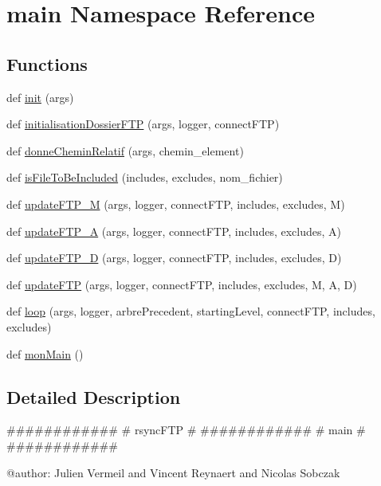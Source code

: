 \hypertarget{namespacemain}{}\section{main Namespace Reference}
\label{namespacemain}
\subsection*{Functions}
\begin{DoxyCompactItemize}
\item 
def \hyperlink{namespacemain_a0e290154722b65ed489c05ccb63123a4}{init} (args)
\item 
def \hyperlink{namespacemain_af2b805eecb08e493981427109e24bfb4}{initialisation\+Dossier\+F\+TP} (args, logger, connect\+F\+TP)
\item 
def \hyperlink{namespacemain_a00446ed819ceb3ba2a2efc386436b91c}{donne\+Chemin\+Relatif} (args, chemin\+\_\+element)
\item 
def \hyperlink{namespacemain_a7521c189c12c457f31fb27b6f1b8054c}{is\+File\+To\+Be\+Included} (includes, excludes, nom\+\_\+fichier)
\item 
def \hyperlink{namespacemain_a97bbb0b263cc3d0576c9d51867c02af6}{update\+F\+T\+P\+\_\+M} (args, logger, connect\+F\+TP, includes, excludes, M)
\item 
def \hyperlink{namespacemain_adc47cfe67a92cb5fbd422ddb0a0c15a2}{update\+F\+T\+P\+\_\+A} (args, logger, connect\+F\+TP, includes, excludes, A)
\item 
def \hyperlink{namespacemain_a4964e4c5c1465407b8c22345fcc80819}{update\+F\+T\+P\+\_\+D} (args, logger, connect\+F\+TP, includes, excludes, D)
\item 
def \hyperlink{namespacemain_aa918b0ca63b511b11c02252a8622bc10}{update\+F\+TP} (args, logger, connect\+F\+TP, includes, excludes, M, A, D)
\item 
def \hyperlink{namespacemain_acb8acded5eecc7be91fabc0f0b0f9090}{loop} (args, logger, arbre\+Precedent, starting\+Level, connect\+F\+TP, includes, excludes)
\item 
def \hyperlink{namespacemain_abc81a2bc9032239e47ace22a92fe0cc6}{mon\+Main} ()
\end{DoxyCompactItemize}


\subsection{Detailed Description}
\begin{DoxyVerb}############
# rsyncFTP #
############
# main     #
############

@author: Julien Vermeil and Vincent Reynaert and Nicolas Sobczak
\end{DoxyVerb}
 

